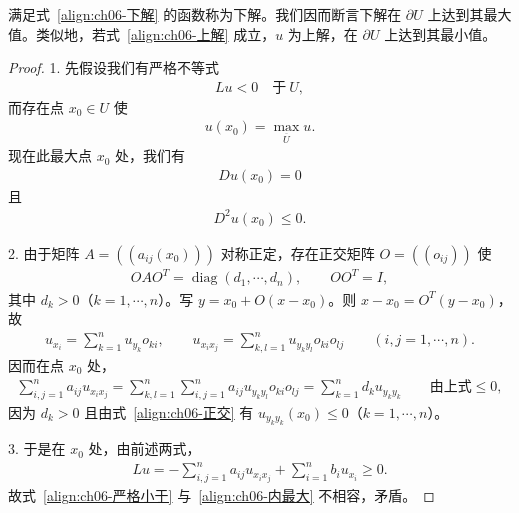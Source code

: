 \documentclass[../../main.tex]{subfiles}
\begin{document}
\begin{remark}\label{remark:ch06-上下解}
满足式~\eqref{align:ch06-下解} 的函数称为下解。我们因而断言下解在 $\partial U$ 上达到其最大值。类似地，若式~\eqref{align:ch06-上解} 成立，$u$ 为上解，在 $\partial U$ 上达到其最小值。
\end{remark}

\begin{proof}
1. 先假设我们有严格不等式
\begin{align}
Lu<0\quad\text{于}\ U,
\end{align}
而存在点 $x_{0}\in U$ 使
\begin{align}
u(x_{0})=\max_{\overline{U}}u.
\end{align}
现在此最大点 $x_{0}$ 处，我们有
\begin{align}
Du(x_{0})=0
\end{align}
且
\begin{align}
D^{2}u(x_{0})\leqslant 0.
\end{align}

2. 由于矩阵 $A=((a_{ij}(x_{0})))$ 对称正定，存在正交矩阵 $O=((o_{ij}))$ 使
\begin{align}
OAO^{T}=\operatorname{diag}(d_{1},\cdots,d_{n}),\qquad OO^{T}=I,
\end{align}
其中 $d_{k}>0$（$k=1,\cdots,n$）。写 $y=x_{0}+O(x-x_{0})$。则 $x-x_{0}=O^{T}(y-x_{0})$，故
\begin{align*}
u_{x_{i}}=\sum_{k=1}^{n}u_{y_{k}}o_{ki},\qquad
u_{x_{i}x_{j}}=\sum_{k,l=1}^{n}u_{y_{k}y_{l}}o_{ki}o_{lj}\qquad (i,j=1,\cdots,n).
\end{align*}
因而在点 $x_{0}$ 处，
\begin{align}
\sum_{i,j=1}^{n}a_{ij}u_{x_{i}x_{j}}
=\sum_{k,l=1}^{n}\sum_{i,j=1}^{n}a_{ij}u_{y_{k}y_{l}}o_{ki}o_{lj}
=\sum_{k=1}^{n}d_{k}u_{y_{k}y_{k}}\qquad\text{由上式}
\leqslant 0,
\end{align}
因为 $d_{k}>0$ 且由式~\eqref{align:ch06-正交} 有 $u_{y_{k}y_{k}}(x_{0})\leqslant 0$（$k=1,\cdots,n$）。

3. 于是在 $x_{0}$ 处，由前述两式，
\begin{align*}
Lu=-\sum_{i,j=1}^{n}a_{ij}u_{x_{i}x_{j}}+\sum_{i=1}^{n}b_{i}u_{x_{i}}\geqslant 0.
\end{align*}
故式~\eqref{align:ch06-严格小于} 与~\eqref{align:ch06-内最大} 不相容，矛盾。


\end{proof}
\end{document}
